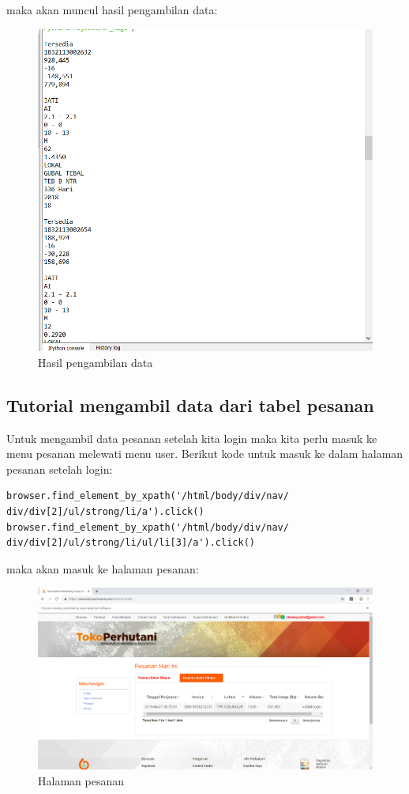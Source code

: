 maka akan muncul hasil pengambilan data:
\begin{figure}[h]
	\centering
	\includegraphics[scale=0.30]{figures/7dataambil}
	\caption{Hasil pengambilan data}
\end{figure}
\newpage
\subsection{Tutorial mengambil data dari tabel pesanan}
Untuk mengambil data pesanan setelah kita login maka kita perlu masuk ke menu pesanan melewati menu user.
Berikut kode untuk masuk ke dalam halaman pesanan setelah login:
\begin{verbatim}
browser.find_element_by_xpath('/html/body/div/nav/
div/div[2]/ul/strong/li/a').click()
browser.find_element_by_xpath('/html/body/div/nav/
div/div[2]/ul/strong/li/ul/li[3]/a').click()
\end{verbatim}
maka akan masuk ke halaman pesanan:
\begin{figure}[h]
	\centering
	\includegraphics[scale=0.30]{figures/8pesanan}
	\caption{Halaman pesanan}
\end{figure}

